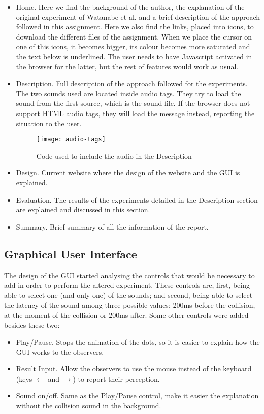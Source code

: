 \begin{itemize}
    \item Home. Here we find the background of the author, the explanation of the original experiment of Watanabe et al. and a brief description of the approach followed in this assignment. Here we also find the links, placed into icons, to download the different files of the assignment. When we place the cursor on one of this icons, it becomes bigger, its colour becomes more saturated and the text below is underlined. The user needs to have Javascript activated in the browser for the latter, but the rest of features would work as usual.
    \item Description. Full description of the approach followed for the experiments. The two sounds used are located inside audio tags. They try to load the sound from the first source, which is the sound file. If the browser does not support HTML audio tags, they will load the message instead, reporting the situation to the user. 

    \begin{figure}[!ht]
			\centering
			\vspace{0.5cm}
			\texttt{[image: audio-tags]}
			\caption{Code used to include the audio in the Description}
	\end{figure} 

	\item Design. Current website where the design of the website and the GUI is explained.
	\item Evaluation. The results of the experiments detailed in the Description section are explained and discussed in this section.
	\item Summary. Brief summary of all the information of the report. 
\end{itemize}

\subsection{Graphical User Interface}
 The design of the GUI started analysing the controls that would be necessary to add in order to perform the altered experiment. These controls are, first, being able to select one (and only one) of the sounds; and second, being able to select the latency of the sound among three possible values: 200ms before the collision, at the moment of the collision or 200ms after. Some other controls were added besides these two:

\begin{itemize}
    \item Play/Pause. Stops the animation of the dots, so it is easier to explain how the GUI works to the observers.
    \item Result Input. Allow the observers to use the mouse instead of the keyboard (keys $\leftarrow$ and $\rightarrow$) to report their perception.
    \item Sound on/off. Same as the Play/Pause control, make it easier the explanation without the collision sound in the background.
\end{itemize}

